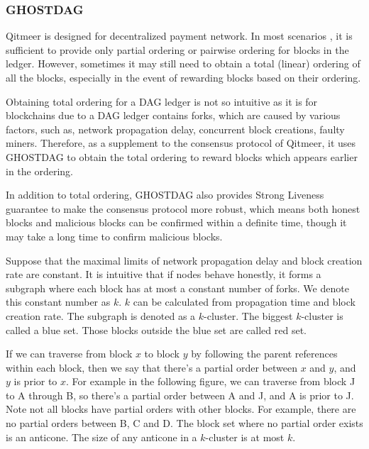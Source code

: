 \documentclass[a4paper,11pt]{article}
\begin{document}
\subsubsection{GHOSTDAG}


Qitmeer is designed for decentralized payment network. In most scenarios , it is sufficient to provide only partial ordering or pairwise ordering for blocks in the ledger. However, sometimes it may still need to obtain a total (linear) ordering of all the blocks, especially in the event of rewarding blocks based on their ordering. 

Obtaining total ordering for a DAG ledger is not so intuitive as it is for blockchains due to a DAG ledger contains forks, which are caused by various factors, such as, network propagation delay, concurrent block creations, faulty miners. Therefore, as a supplement to the consensus protocol of Qitmeer, it uses GHOSTDAG to obtain the total ordering to reward blocks which appears earlier in the ordering.

In addition to total ordering, GHOSTDAG also provides Strong Liveness guarantee to make the consensus protocol more robust, which means both honest blocks and malicious blocks can be confirmed within a definite time, though it may take a long time to confirm malicious blocks.

Suppose that the maximal limits of network propagation delay and block creation
rate are constant. It is intuitive that if nodes behave honestly, it forms a subgraph where each block has at most a constant number of forks. We denote
this constant number as $k$. $k$ can be calculated from propagation time and
block creation rate. The subgraph is denoted as a $k$-cluster. The biggest
$k$-cluster is called a blue set. Those blocks outside the blue set are called
red set.

If we can traverse from block $x$ to block $y$ by following the parent
references within each block, then we say that there's a partial order between
$x$ and $y$, and $y$ is prior to $x$. For example in the following figure, we
can traverse from block J to A through B, so there's a partial order between A
and J, and A is prior to J. Note not all blocks have partial orders with other
blocks. For example, there are no partial orders between B, C and D.  The block set where no partial order exists is an anticone. The size of any anticone in
a $k$-cluster is at most $k$.
\end{document}
